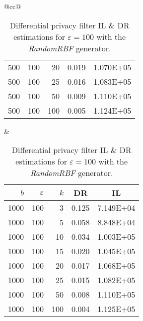\begin{table}[H]
\begin{tabular}{@{}cc@{}}
\begin{tabular}{@{}rrrrr@{}}
			500 & 100 & 20  & 0.019 & 1.070E+05 \\
			500 & 100 & 25  & 0.016 & 1.083E+05 \\
			500 & 100 & 50  & 0.009 & 1.110E+05 \\
			500 & 100 & 100 & 0.005 & 1.124E+05 \\ \bottomrule
		\end{tabular}
		&
		\begin{tabular}{@{}rrrrr@{}}
			\toprule
			$b$ & $\varepsilon$ & $k$ & \multicolumn{1}{c}{DR} & \multicolumn{1}{c}{IL} \\ \midrule
			1000 & 100 & 3   & 0.125 & 7.149E+04 \\
			1000 & 100 & 5   & 0.058 & 8.848E+04 \\
			1000 & 100 & 10  & 0.034 & 1.003E+05 \\
			1000 & 100 & 15  & 0.020 & 1.045E+05 \\
			1000 & 100 & 20  & 0.017 & 1.068E+05 \\
			1000 & 100 & 25  & 0.015 & 1.082E+05 \\
			1000 & 100 & 50  & 0.008 & 1.110E+05 \\
			1000 & 100 & 100 & 0.004 & 1.125E+05 \\ \bottomrule
		\end{tabular}
	\end{tabular}
	\caption[Differential privacy filter DR \& IL estimations (RandomRBF), $\varepsilon = 100$.]{Differential privacy filter IL \& DR estimations for $\varepsilon = 100$ with the \textit{RandomRBF} generator.}
\end{table}

